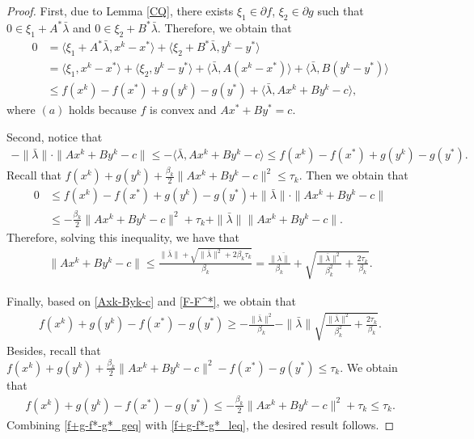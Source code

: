 \documentclass{article}
\numberwithin{equation}{section}
\begin{document}
\begin{proof}
    First, due to Lemma \ref{CQ}, there exists $\xi_1 \in \partial f$, $\xi_2\in \partial g$ such that 
    $0 \in \xi_1 + A^*\bar{\lambda}$ and $0\in \xi_2+B^*\bar{\lambda}$.
    Therefore, we obtain that 
    \begin{align}
        0&= \langle \xi_1+A^*\bar{\lambda}, x^k -x^*\rangle+ \langle \xi_2+B^*\bar{\lambda}, y^k-y^*\rangle \nonumber \\
        & =\langle \xi_1, x^k -x^* \rangle +\langle \xi_2, y^k -y^*\rangle +\langle \bar{\lambda}, A(x^k-x^*) \rangle +\langle \bar{\lambda}, B(y^k-y^*) \rangle \nonumber \\
        &\overset{\mathop{(a)}}{\leq} f(x^k) -f(x^*) + g(y^k) -g(y^*) + \langle \bar{\lambda}, Ax^k+By^k-c\rangle, 
    \end{align}
    where $(a)$ holds because $f$ is convex 
    and $Ax^* + By^* = c$. 
    
    Second, notice that 
    \begin{align}
       -\|\bar{\lambda}\rVert \cdot\|Ax^k+By^k-c\rVert\leq -\langle \bar{\lambda}, Ax^k+By^k-c\rangle \leq f(x^k) -f(x^*) + g(y^k) -g(y^*). \label{F-F^*}
    \end{align}
    Recall that $f(x^k)+ g(y^k)+\frac{\beta_k}{2}\|Ax^k+By^k-c\rVert^2\leq \tau_k$. Then we obtain that 
    \begin{align}
        0&\leq f(x^k) -f(x^*) + g(y^k) -g(y^*) + \|\bar{\lambda}\rVert \cdot \|Ax^k+By^k-c\rVert \nonumber \\
        & \leq -\frac{\beta_k}{2}\|Ax^k+By^k-c\|^2 + \tau_k +\|\bar{\lambda}\rVert\|Ax^k+By^k-c\|. 
    \end{align}
    Therefore, solving this inequality, we have that 
    \begin{align}
        \|Ax^k+By^k-c\rVert \leq \frac{\|\bar{\lambda}\rVert+\sqrt{\|\bar{\lambda}\rVert^2+2\beta_k\tau_k}}{\beta_k}
        =\frac{\|\bar{\lambda\rVert}}{\beta_k}+\sqrt{\frac{\|\bar{\lambda}\rVert^2}{\beta_k^2}+\frac{2\tau_k}{\beta_k}}. \label{Axk-Byk-c}
    \end{align}

    Finally, based on \eqref{Axk-Byk-c} and \eqref{F-F^*}, we obtain that 
    \begin{align}
        f(x^k) + g(y^k) -f(x^*)- g(y^*) \geq -\frac{\|\bar{\lambda}\rVert^2}{\beta_k}- \|\bar{\lambda}\rVert\sqrt{\frac{\|\bar{\lambda}\rVert^2}{\beta_k^2}+\frac{2\tau_k}{\beta_k}}. 
        \label{f+g-f*-g*_geq}
    \end{align}
    Besides, recall that $f(x^k)+ g(y^k)+\frac{\beta_k}{2}\|Ax^k+By^k-c\rVert^2 -f(x^*)-g(y^*)\leq \tau_k$. 
    We obtain that 
    \begin{align}
        f(x^k)+ g(y^k) -f(x^*)-g(y^*)\leq -\frac{\beta_k}{2}\|Ax^k+By^k-c\rVert^2+ \tau_k \leq \tau_k.   \nonumber
        \label{f+g-f*-g*_leq}
    \end{align}
    Combining \eqref{f+g-f*-g*_geq} with \eqref{f+g-f*-g*_leq}, the desired result follows. 
\end{proof}
\end{document}

